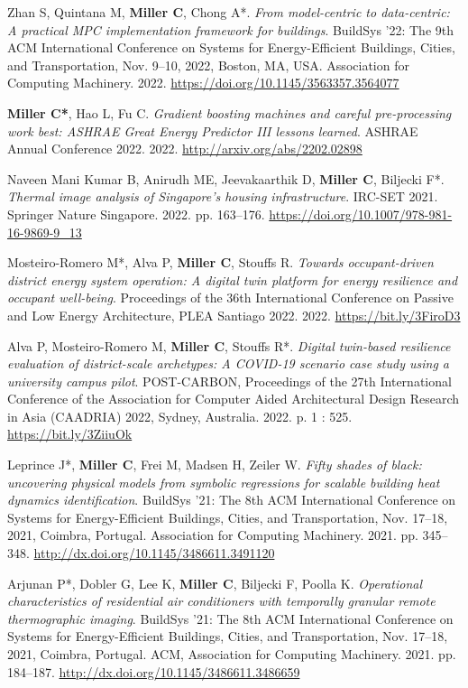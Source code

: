 \documentclass[10pt,a4paper]{article}
\begin{document}
\begin{small}
\begin{etaremune}
\item
Zhan S, Quintana M, \textbf{Miller C}, Chong A*. \emph{From model-centric to data-centric: A practical MPC implementation framework for buildings}. BuildSys ’22: The 9th ACM International Conference on Systems for Energy-Efficient Buildings, Cities, and Transportation, Nov. 9–10, 2022, Boston, MA, USA. Association for Computing Machinery.  2022. \url{https://doi.org/10.1145/3563357.3564077}
\item
\textbf{Miller C*}, Hao L, Fu C. \emph{Gradient boosting machines and careful pre-processing work best: ASHRAE Great Energy Predictor III lessons learned}. ASHRAE Annual Conference 2022. 2022. \url{http://arxiv.org/abs/2202.02898}
\item
Naveen Mani Kumar B, Anirudh ME, Jeevakaarthik D, \textbf{Miller C}, Biljecki F*. \emph{Thermal image analysis of Singapore’s housing infrastructure}. IRC-SET 2021. Springer Nature Singapore. 2022. pp. 163–176. \url{https://doi.org/10.1007/978-981-16-9869-9_13}
\item
Mosteiro-Romero M*, Alva P, \textbf{Miller C}, Stouffs R. \emph{Towards occupant-driven district energy system operation: A digital twin platform for energy resilience and occupant well-being}. Proceedings of the 36th International Conference on Passive and Low Energy Architecture, PLEA Santiago 2022. 2022. \url{https://bit.ly/3FiroD3}
\item
Alva P, Mosteiro-Romero M, \textbf{Miller C}, Stouffs R*. \emph{Digital twin-based resilience evaluation of district-scale archetypes: A COVID-19 scenario case study using a university campus pilot}. POST-CARBON, Proceedings of the 27th International Conference of the Association for Computer Aided Architectural Design Research in Asia (CAADRIA) 2022, Sydney, Australia. 2022. p. 1 : 525. \url{https://bit.ly/3ZiiuOk}
\item
Leprince J*, \textbf{Miller C}, Frei M, Madsen H, Zeiler W. \emph{Fifty shades of black: uncovering physical models from symbolic regressions for scalable building heat dynamics identification}. BuildSys ’21: The 8th ACM International Conference on Systems for Energy-Efficient Buildings, Cities, and Transportation, Nov. 17–18, 2021, Coimbra, Portugal. Association for Computing Machinery. 2021. pp. 345–348. \url{http://dx.doi.org/10.1145/3486611.3491120}
\item
Arjunan P*, Dobler G, Lee K, \textbf{Miller C}, Biljecki F, Poolla K. \emph{Operational characteristics of residential air conditioners with temporally granular remote thermographic imaging}. BuildSys ’21: The 8th ACM International Conference on Systems for Energy-Efficient Buildings, Cities, and Transportation, Nov. 17–18, 2021, Coimbra, Portugal. ACM, Association for Computing Machinery. 2021. pp. 184–187. \url{http://dx.doi.org/10.1145/3486611.3486659}

\end{etaremune}
\end{small}
\end{document}
